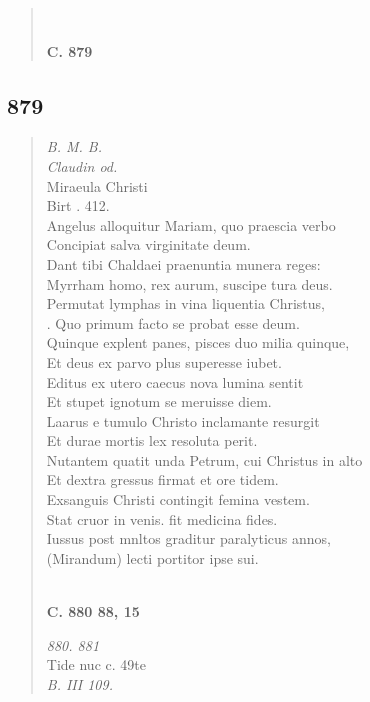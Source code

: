 \documentclass[11pt, a4paper]{report}
\begin{document}
\begin{verse}
        ﻿\pagebreak 
     \marginpar{[329]} \begin{center} \textbf{C. 879} \end{center}
      \end{verse}
  
            \subsection*{879}
      \begin{verse}
      \textit{B. M. B.} \\ \textit{Claudin od.} \\ Miraeula Christi \\ Birt . 412. \\ Angelus alloquitur Mariam, quo praescia verbo \\ Concipiat salva virginitate deum. \\ Dant tibi Chaldaei praenuntia munera reges: \\ Myrrham homo, rex aurum, suscipe tura deus. \\ Permutat lymphas in vina liquentia Christus, \\ . Quo primum facto se probat esse deum. \\ Quinque explent panes, pisces duo milia quinque, \\ Et deus ex parvo plus superesse iubet. \\ Editus ex utero caecus nova lumina sentit \\ Et stupet ignotum se meruisse diem. \\ Laarus e tumulo Christo inclamante resurgit \\ Et durae mortis lex resoluta perit. \\ Nutantem quatit unda Petrum, cui Christus in alto \\ Et dextra gressus firmat et ore tidem. \\ Exsanguis Christi contingit femina vestem. \\ Stat cruor in venis. fit medicina fides. \\ Iussus post mnltos graditur paralyticus annos, \\ (Mirandum) lecti portitor ipse sui. \\ 
        ﻿\pagebreak 
    \begin{center} \textbf{C. 880 88, 15} \end{center} \marginpar{[330]} \textit{880. 881} \\ Tide nuc c. 49te \\ \textit{B. III 109.} \\ 
      \end{verse}
  
\end{document}
